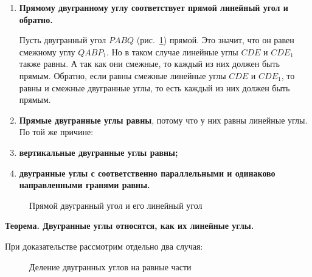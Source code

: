 \begin{enumerate}[label=\arabic*),ref=\arabic*]
    \item\label{item:right-dihedral-and-linear-angle} \textbf{Прямому двугранному углу соответствует прямой линейный угол и обратно.}

    Пусть двугранный угол \(PABQ\) (рис.~\ref{fig:kiselev-stereo-335}) прямой. Это значит, что он равен смежному углу \(QABP_1\). Но в таком случае линейные углы \(CDE\) и \(CDE_1\) также равны. А так как они смежные, то каждый из них должен быть прямым. Обратно, если равны смежные линейные углы \(CDE\) и \(CDE_1\), то равны и смежные двугранные углы, то есть каждый из них должен быть прямым.

    \item \textbf{Прямые двугранные углы равны}, потому что у них равны линейные углы. По той же причине:
    \item \textbf{вертикальные двугранные углы равны;}
    \item \textbf{двугранные углы с соответственно параллельными и одинаково направленными гранями равны.}
\end{enumerate}

\begin{figure}[htbp]
    \centering
    \renewcommand{\thefigure}{335}
    \captionsetup{name=Рис.,labelsep=period}
    
    \caption{Прямой двугранный угол и его линейный угол}\label{fig:kiselev-stereo-335}
\end{figure}

 \textbf{Теорема. Двугранные углы относятся, как их линейные углы.}

При доказательстве рассмотрим отдельно два случая:

\begin{figure}[htbp]
    \centering
    \renewcommand{\thefigure}{336}
    \captionsetup{name=Рис.,labelsep=period}
    
    \caption{Деление двугранных углов на равные части}\label{fig:kiselev-stereo-336}
\end{figure}

